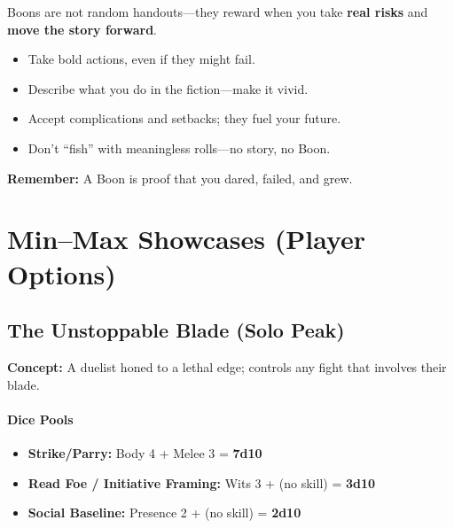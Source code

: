 \documentclass[11pt]{book}
\begin{document}
\begin{tcolorbox}[title=Player Tip: How to Earn Boons,colback=black!2,colframe=black!40!white]
  Boons are not random handouts—they reward when you take \textbf{real risks} and \textbf{move the story forward}.  
  
  \begin{itemize}
    \item Take bold actions, even if they might fail.  
    \item Describe what you do in the fiction—make it vivid.  
    \item Accept complications and setbacks; they fuel your future.  
    \item Don’t “fish” with meaningless rolls—no story, no Boon.  
  \end{itemize}
  
  \textbf{Remember:} A Boon is proof that you dared, failed, and grew.
  \end{tcolorbox}

\section*{Min–Max Showcases (Player Options)}

\subsection*{The Unstoppable Blade (Solo Peak)}
\textbf{Concept:} A duelist honed to a lethal edge; controls any fight that involves their blade.

\paragraph{Dice Pools}
\begin{itemize}
  \item \textbf{Strike/Parry:} Body 4 + Melee 3 = \textbf{7d10}
  \item \textbf{Read Foe / Initiative Framing:} Wits 3 + (no skill) = \textbf{3d10}
  \item \textbf{Social Baseline:} Presence 2 + (no skill) = \textbf{2d10}
\end{itemize}
\end{document}
